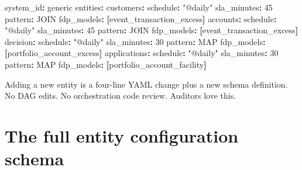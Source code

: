 \documentclass[
  11pt,
  british,
  oneside]{book}
\newenvironment{Shaded}{\begin{snugshade}}{\end{snugshade}}
\newcommand{\AttributeTok}[1]{\textcolor[rgb]{0.77,0.63,0.00}{#1}}
\newcommand{\DecValTok}[1]{\textcolor[rgb]{0.00,0.00,0.81}{#1}}
\newcommand{\FunctionTok}[1]{\textcolor[rgb]{0.00,0.00,0.00}{#1}}
\newcommand{\KeywordTok}[1]{\textcolor[rgb]{0.13,0.29,0.53}{\textbf{#1}}}
\newcommand{\StringTok}[1]{\textcolor[rgb]{0.31,0.60,0.02}{#1}}
\begin{document}
\begin{Shaded}
\begin{Highlighting}[]
\FunctionTok{system\_id}\KeywordTok{:}\AttributeTok{ generic}
\FunctionTok{entities}\KeywordTok{:}
\AttributeTok{  }\FunctionTok{customers}\KeywordTok{:}
\AttributeTok{    }\FunctionTok{schedule}\KeywordTok{:}\AttributeTok{ }\StringTok{"@daily"}
\AttributeTok{    }\FunctionTok{sla\_minutes}\KeywordTok{:}\AttributeTok{ }\DecValTok{45}
\AttributeTok{    }\FunctionTok{pattern}\KeywordTok{:}\AttributeTok{ JOIN}
\AttributeTok{    }\FunctionTok{fdp\_models}\KeywordTok{:}\AttributeTok{ }\KeywordTok{[}\AttributeTok{event\_transaction\_excess}\KeywordTok{]}
\AttributeTok{  }\FunctionTok{accounts}\KeywordTok{:}
\AttributeTok{    }\FunctionTok{schedule}\KeywordTok{:}\AttributeTok{ }\StringTok{"@daily"}
\AttributeTok{    }\FunctionTok{sla\_minutes}\KeywordTok{:}\AttributeTok{ }\DecValTok{45}
\AttributeTok{    }\FunctionTok{pattern}\KeywordTok{:}\AttributeTok{ JOIN}
\AttributeTok{    }\FunctionTok{fdp\_models}\KeywordTok{:}\AttributeTok{ }\KeywordTok{[}\AttributeTok{event\_transaction\_excess}\KeywordTok{]}
\AttributeTok{  }\FunctionTok{decision}\KeywordTok{:}
\AttributeTok{    }\FunctionTok{schedule}\KeywordTok{:}\AttributeTok{ }\StringTok{"@daily"}
\AttributeTok{    }\FunctionTok{sla\_minutes}\KeywordTok{:}\AttributeTok{ }\DecValTok{30}
\AttributeTok{    }\FunctionTok{pattern}\KeywordTok{:}\AttributeTok{ MAP}
\AttributeTok{    }\FunctionTok{fdp\_models}\KeywordTok{:}\AttributeTok{ }\KeywordTok{[}\AttributeTok{portfolio\_account\_excess}\KeywordTok{]}
\AttributeTok{  }\FunctionTok{applications}\KeywordTok{:}
\AttributeTok{    }\FunctionTok{schedule}\KeywordTok{:}\AttributeTok{ }\StringTok{"@daily"}
\AttributeTok{    }\FunctionTok{sla\_minutes}\KeywordTok{:}\AttributeTok{ }\DecValTok{30}
\AttributeTok{    }\FunctionTok{pattern}\KeywordTok{:}\AttributeTok{ MAP}
\AttributeTok{    }\FunctionTok{fdp\_models}\KeywordTok{:}\AttributeTok{ }\KeywordTok{[}\AttributeTok{portfolio\_account\_facility}\KeywordTok{]}
\end{Highlighting}
\end{Shaded}

Adding a new entity is a four-line YAML change plus a new schema
definition. No DAG edits. No orchestration code review. Auditors love
this.

\hypertarget{the-full-entity-configuration-schema}{%
\section{The full entity configuration
schema}\label{the-full-entity-configuration-schema}}
\end{document}
